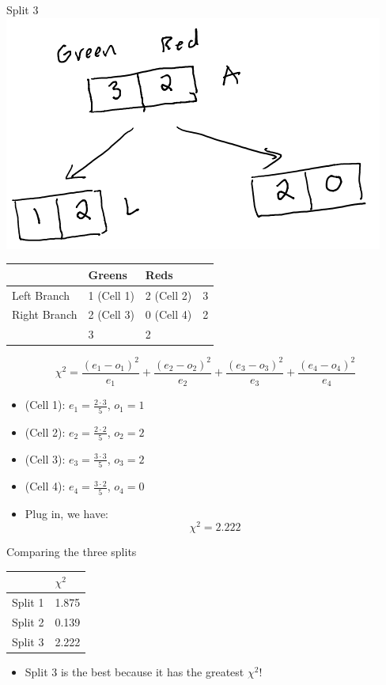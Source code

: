 \documentclass[
  ignorenonframetext,
]{beamer}
\providecommand{\tightlist}{%
  \setlength{\itemsep}{0pt}\setlength{\parskip}{0pt}}
\begin{document}
\begin{frame}{Split 3}
\protect\hypertarget{split-3}{}
\includegraphics{images/im2.png}

\begin{longtable}[]{@{}llll@{}}
\toprule
& Greens & Reds & \\
\midrule
\endhead
Left Branch & 1 (Cell 1) & 2 (Cell 2) & 3 \\
Right Branch & 2 (Cell 3) & 0 (Cell 4) & 2 \\
& 3 & 2 & \\
\bottomrule
\end{longtable}

\[\chi^2 = \frac{(e_1-o_1)^2}{e_1}+\frac{(e_2-o_2)^2}{e_2}+\frac{(e_3-o_3)^2}{e_3}+\frac{(e_4-o_4)^2}{e_4}\]

\begin{itemize}
\item
  (Cell 1): \(e_1 = \frac{2\cdot 3}{5}\), \(o_1 = 1\)
\item
  (Cell 2): \(e_2 = \frac{2\cdot 2}{5}\), \(o_2 = 2\)
\item
  (Cell 3): \(e_3 = \frac{3\cdot 3}{5}\), \(o_3 = 2\)
\item
  (Cell 4): \(e_4 = \frac{3\cdot 2}{5}\), \(o_4 = 0\)
\item
  Plug in, we have: \[\chi^2 = 2.222\]
\end{itemize}
\end{frame}

\begin{frame}{Comparing the three splits}
\protect\hypertarget{comparing-the-three-splits}{}
\begin{longtable}[]{@{}ll@{}}
\toprule
& \(\chi^2\) \\
\midrule
\endhead
Split 1 & 1.875 \\
Split 2 & 0.139 \\
Split 3 & 2.222 \\
\bottomrule
\end{longtable}

\begin{itemize}
\tightlist
\item
  Split 3 is the best because it has the greatest \(\chi^2\)!
\end{itemize}
\end{frame}
\end{document}

